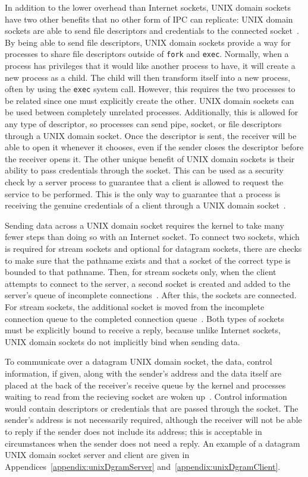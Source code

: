 In addition to the lower overhead than Internet sockets, UNIX domain sockets have two other benefits that no other form of IPC can replicate: UNIX domain sockets are able to send file descriptors and credentials to the connected socket~\cite[p 381--394]{Stevens:1997:UNP:522800}.  By being able to send file descriptors, UNIX domain sockets provide a way for processes to share file descriptors outside of \texttt{fork} and \texttt{exec}.  Normally, when a process has privileges that it would like another process to have, it will create a new process as a child.  The child will then transform itself into a new process, often by using the \texttt{exec} system call.  However, this requires the two processes to be related since one must explicitly create the other.  UNIX domain sockets can be used between completely unrelated processes.  Additionally, this is allowed for any type of descriptor, so processes can send pipe, socket, or file descriptors through a UNIX domain socket.  Once the descriptor is sent, the receiver will be able to open it whenever it chooses, even if the sender closes the descriptor before the receiver opens it.  The other unique benefit of UNIX domain sockets is their ability to pass credentials through the socket.  This can be used as a security check by a server process to guarantee that a client is allowed to request the service to be performed.  This is the only way to guarantee that a process is receiving the genuine credentials of a client through a UNIX domain socket~\cite[p 391]{Stevens:1997:UNP:522800}.

Sending data across a UNIX domain socket requires the kernel to take many fewer steps than doing so with an Internet socket.  To connect two sockets, which is required for stream sockets and optional for datagram sockets, there are checks to make sure that the pathname exists and that a socket of the correct type is bounded to that pathname.  Then, for stream sockets only, when the client attempts to connect to the server, a second socket is created and added to the server's queue of incomplete connections~\cite[p 240--245]{Stevens:1996:TIT:233130}.  After this, the sockets are connected.  For stream sockets, the additional socket is moved from the incomplete connection queue to the completed connection queue~\cite[p 245--249]{Stevens:1996:TIT:233130}.  Both types of sockets must be explicitly bound to receive a reply, because unlike Internet sockets, UNIX domain sockets do not implicitly bind when sending data.

To communicate over a datagram UNIX domain socket, the data, control information, if given, along with the sender's address and the data itself are placed at the back of the receiver's receive queue by the kernel and processes waiting to read from the recieving socket are woken up~\cite[p 263--265]{Stevens:1996:TIT:233130}.  Control information would contain descriptors or credentials that are passed through the socket.  The sender's address is not necessarily required, although the receiver will not be able to reply if the sender does not include its address; this is acceptable in circumstances when the sender does not need a reply.  An example of a datagram UNIX domain socket server and client are given in Appendices~\ref{appendix:unixDgramServer} and~\ref{appendix:unixDgramClient}.

